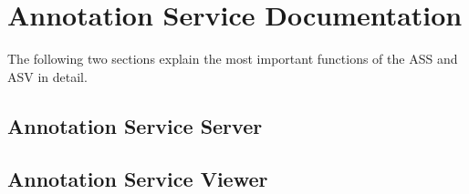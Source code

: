 \chapter{Annotation Service Documentation}

The following two sections explain the most important functions of the ASS and ASV in detail.

\section{Annotation Service Server}


\section{Annotation Service Viewer}